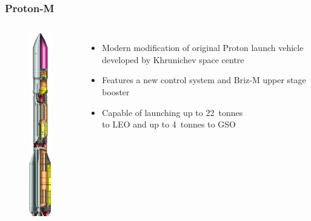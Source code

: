 \documentclass[onlymath]{beamer}
\begin{document}
\begin{frame}
  \frametitle{Proton-M}
  \begin{columns}
    \begin{figure}
      \centering
      \includegraphics[scale=0.4]{Proton-M-scheme.jpg}
    \end{figure}
    
    \begin{itemize}
    \item Modern modification of original Proton launch vehicle
      developed by Khrunichev space centre
    \item Features a new control system and Briz-M upper stage booster
    \item Capable of launching up to 22 tonnes \\to LEO and up to
      4 tonnes to GSO
    \end{itemize}
  \end{columns}

\end{frame}
\end{document}
